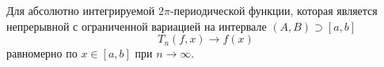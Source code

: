 
\begin{to_thr}
    Для абсолютно интегрируемой $2\pi$-периодической функции, которая является непрерывной с ограниченной вариацией на интервале $(A, B) \supset [a, b]$
    \begin{equation*}
        T_n (f, x) \to f(x)
    \end{equation*}
    равномерно по $x \in [a, b]$ при $n \to \infty$.
\end{to_thr}





